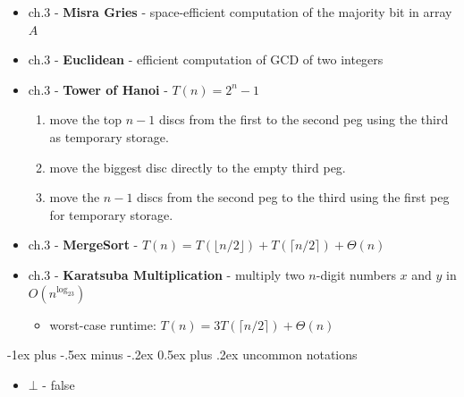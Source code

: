 \documentclass[10pt, landscape]{article}
\makeatletter
\renewcommand{\section}{\@startsection{section}{1}{0mm}%
  {-1ex plus -.5ex minus -.2ex}%
  {0.5ex plus .2ex}%
{\normalfont\large\bfseries}}
\makeatother
\begin{document}
\begin{itemize}
  \item ch.3 - \textbf{Misra Gries} - space-efficient computation of the majority bit in array $A$
  \item ch.3 - \textbf{Euclidean} - efficient computation of GCD of two integers
  \item ch.3 - \textbf{Tower of Hanoi} - $T(n) = 2^n-1$
    \begin{enumerate}
      \item move the top $n-1$ discs from the first to the second peg using the third as temporary storage. 
      \item move the biggest disc directly to the empty third peg.
      \item move the $n-1$ discs from the second peg to the third using the first peg for temporary storage.
    \end{enumerate}
  \item ch.3 - \textbf{MergeSort} - $T(n) = T(\lfloor n/2 \rfloor) + T(\lceil n/2 \rceil) + \Theta(n)$
  \item ch.3 - \textbf{Karatsuba Multiplication} - multiply two $n$-digit numbers $x$ and $y$ in $O(n^{\log_23})$
    \begin{itemize}
      \item worst-case runtime: $T(n) = 3T( \lceil n/2 \rceil ) + \Theta(n) $
    \end{itemize}
\end{itemize}

\section{uncommon notations}

\begin{itemize}
  \item $\bot$ - false
\end{itemize}
\end{document}

